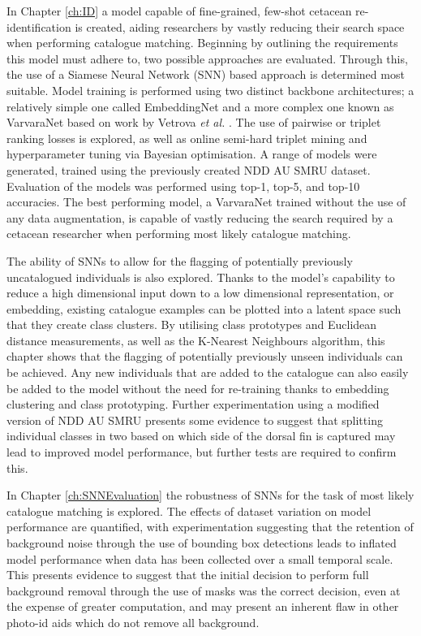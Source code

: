In Chapter \ref{ch:ID} a model capable of fine-grained, few-shot cetacean re-identification is created, aiding researchers by vastly reducing their search space when performing catalogue matching. Beginning by outlining the requirements this model must adhere to, two possible approaches are evaluated. Through this, the use of a Siamese Neural Network (SNN) based approach is determined most suitable. Model training is performed using two distinct backbone architectures; a relatively simple one called EmbeddingNet and a more complex one known as VarvaraNet based on work by Vetrova \textit{et al.} \cite{vetrova_hidden_2018}. The use of pairwise or triplet ranking losses is explored, as well as online semi-hard triplet mining and hyperparameter tuning via Bayesian optimisation. A range of models were generated, trained using the previously created NDD AU SMRU dataset. Evaluation of the models was performed using top-1, top-5, and top-10 accuracies. The best performing model, a VarvaraNet trained without the use of any data augmentation, is capable of vastly reducing the search required by a cetacean researcher when performing most likely catalogue matching. 

The ability of SNNs to allow for the flagging of potentially previously uncatalogued individuals is also explored. Thanks to the model's capability to reduce a high dimensional input down to a low dimensional representation, or embedding, existing catalogue examples can be plotted into a latent space such that they create class clusters. By utilising class prototypes and Euclidean distance measurements, as well as the K-Nearest Neighbours algorithm, this chapter shows that the flagging of potentially previously unseen individuals can be achieved. Any new individuals that are added to the catalogue can also easily be added to the model without the need for re-training thanks to embedding clustering and class prototyping. Further experimentation using a modified version of NDD AU SMRU presents some evidence to suggest that splitting individual classes in two based on which side of the dorsal fin is captured may lead to improved model performance, but further tests are required to confirm this. 

In Chapter \ref{ch:SNNEvaluation} the robustness of SNNs for the task of most likely catalogue matching is explored. The effects of dataset variation on model performance are quantified, with experimentation suggesting that the retention of background noise through the use of bounding box detections leads to inflated model performance when data has been collected over a small temporal scale. This presents evidence to suggest that the initial decision to perform full background removal through the use of masks was the correct decision, even at the expense of greater computation, and may present an inherent flaw in other photo-id aids which do not remove all background. 

